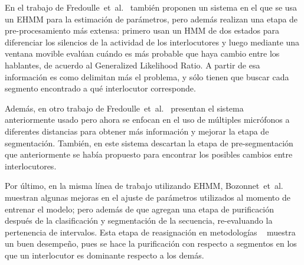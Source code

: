 En el trabajo de Fredoulle~et~al.~\cite{Fredouille2007} también proponen un sistema en el que se usa un \ac{EHMM} para la estimación de parámetros, pero además realizan una etapa de pre-procesamiento más extensa: primero usan un \ac{HMM} de dos estados para diferenciar los silencios de la actividad de los interlocutores y luego mediante una ventana movible evalúan cuándo es más probable que haya cambio entre los hablantes, de acuerdo al Generalized Likelihood Ratio. A partir de esa información es como delimitan más el problema, y sólo tienen que buscar cada segmento encontrado a qué interlocutor corresponde.

Además, en otro trabajo de Fredoulle~et~al.~\cite{Fredouille2009} presentan el sistema \td~ anteriormente usado pero ahora se enfocan en el uso de múltiples micrófonos a diferentes distancias para obtener más información y mejorar la etapa de segmentación. También, en este sistema descartan la etapa de pre-segmentación que anteriormente se había propuesto para encontrar los posibles cambios entre interlocutores. 

Por último, en la misma línea de trabajo utilizando \ac{EHMM}, Bozonnet~et~al.~\cite{Bozonnet2010} muestran algunas mejoras en el ajuste de parámetros utilizados al momento de entrenar el modelo; pero además de que agregan una etapa de purificación después de la clasificación y segmentación de la secuencia, re-evaluando la pertenencia de intervalos. Esta etapa de reasignación en metodologías \td~ muestra un buen desempeño, pues se hace la purificación con respecto a segmentos en los que un interlocutor es dominante respecto a los demás.

